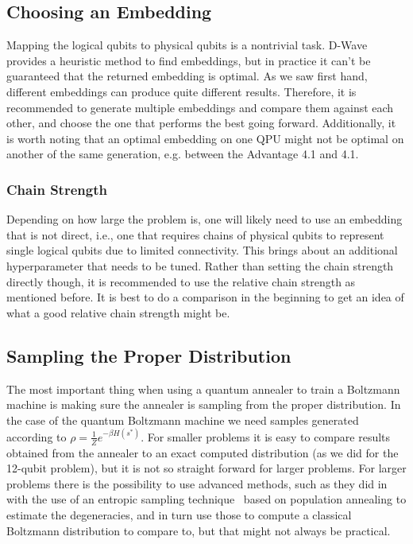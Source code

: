 \subsection{Choosing an Embedding}
Mapping the logical qubits to physical qubits is a nontrivial task.
D-Wave provides a heuristic method to find embeddings, but in practice it can't be guaranteed that the returned embedding is optimal.
As we saw first hand, different embeddings can produce quite different results.
Therefore, it is recommended to generate multiple embeddings and compare them against each other, and choose the one that performs the best going forward.
Additionally, it is worth noting that an optimal embedding on one QPU might not be optimal on another of the same generation, e.g. between the Advantage 4.1 and 4.1.

\subsubsection{Chain Strength}
Depending on how large the problem is, one will likely need to use an embedding that is not direct, i.e., one that requires chains of physical qubits to represent single logical qubits due to limited connectivity.
This brings about an additional hyperparameter that needs to be tuned.
Rather than setting the chain strength directly though, it is recommended to use the relative chain strength as mentioned before.
It is best to do a comparison in the beginning to get an idea of what a good relative chain strength might be.

\subsection{Sampling the Proper Distribution}
The most important thing when using a quantum annealer to train a Boltzmann machine is making sure the annealer is sampling from the proper distribution.
In the case of the quantum Boltzmann machine we need samples generated according to \( \rho = \frac{1}{Z} e^{-\beta H(s^*)} \).
For smaller problems it is easy to compare results obtained from the annealer to an exact computed distribution (as we did for the 12-qubit problem), but it is not so straight forward for larger problems.
For larger problems there is the possibility to use advanced methods, such as they did in~\cite{marshall_2019} with the use of an entropic sampling technique~\cite{barash_2019} based on population annealing to estimate the degeneracies, and in turn use those to compute a classical Boltzmann distribution to compare to, but that might not always be practical.

